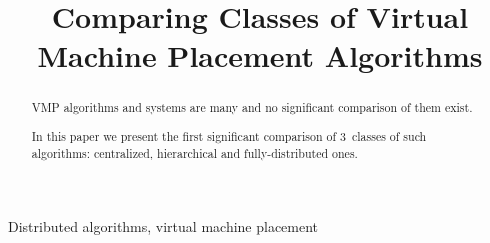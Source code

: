 \documentclass[10pt, conference, compsocconf]{IEEEtran}
\begin{document}
\title{Comparing Classes of Virtual Machine Placement Algorithms}


\author{
}

\maketitle

\tableofcontents


\newpage


\begin{abstract}
  VMP algorithms and systems are many and no significant comparison of
  them exist.

  In this paper we present the first significant comparison of
  3~classes of such algorithms: centralized, hierarchical and
  fully-distributed ones.
\end{abstract}

\begin{IEEEkeywords}
  Distributed algorithms, virtual machine placement
\end{IEEEkeywords}


%
\IEEEpeerreviewmaketitle









\end{document}
